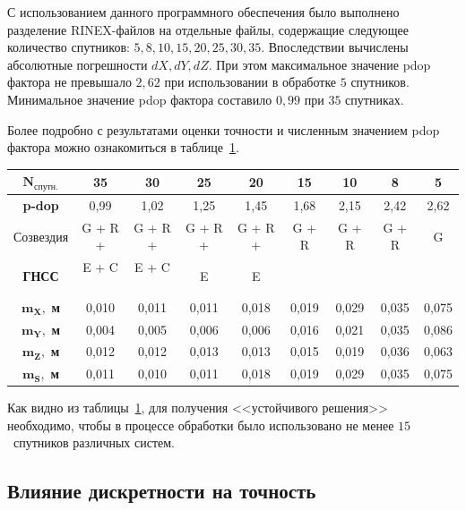 С использованием данного программного обеспечения было выполнено разделение RINEX-файлов на отдельные файлы, содержащие следующее количество спутников: $5, 8, 10, 15, 20, 25, 30, 35$.
%
Впоследствии вычислены абсолютные погрешности $dX, dY, dZ$. При этом максимальное значение pdop фактора не превышало $2,62$ при использовании в обработке $5$ спутников. Минимальное значение pdop фактора составило $0,99$ при $35$ спутниках. 


Более подробно с результатами оценки точности и численным значением pdop фактора можно ознакомиться в таблице~\cref{tab:ref_tab02}.

\begin{table} [htbp]
	\centering\small
	\setlength\tabcolsep{5pt} %
	\label{tab:ref_tab02}{%
		\begin{tabular}{|c|c|c|c|c|c|c|c|c|}
			\hline
			$\mathbf{N_\text{спутн.}}$ & \textbf{35} & \textbf{30} & \textbf{25} & \textbf{20} & \textbf{15} & \textbf{10} & \textbf{8} & \textbf{5} \\ \hline
			\textbf{p-dop}					& 0,99   & 1,02   & 1,25   & 1,45   & 1,68   & 2,15   & 2,42   & 2,62   \\ \hline
			Созвездия 						& G + R +& G + R +& G + R +& G + R +& G + R & G + R & G + R & G \\ %
			\textbf{ГНСС}					& E + C ~& E + C ~& E 	   & E 		& ~	 	& ~ 	& ~		& ~ \\ \hline
			$\mathbf{m_{X},}$\textbf{ м}	& 0,010  & 0,011  & 0,011  & 0,018  & 0,019  & 0,029  & 0,035  & 0,075  \\ \hline
			$\mathbf{m_{Y},}$\textbf{ м}	& 0,004  & 0,005  & 0,006  & 0,006 & 0,016 & 0,021 & 0,035 & 0,086 \\ \hline
			$\mathbf{m_{Z},}$\textbf{ м}	& 0,012  & 0,012  & 0,013  & 0,013  & 0,015  & 0,019  & 0,036  & 0,063  \\ \hline
			$\mathbf{m_{S},}$\textbf{ м}	& 0,011  & 0,010  & 0,011  & 0,018  & 0,019  & 0,029  & 0,035  & 0,075  \\ \hline
		\end{tabular}
	}
\end{table}

Как видно из таблицы~\cref{tab:ref_tab02}, для получения <<устойчивого решения>> необходимо, чтобы в процессе обработки было использовано не менее $15$~спутников различных систем.

\subsection*{Влияние дискретности на точность}

